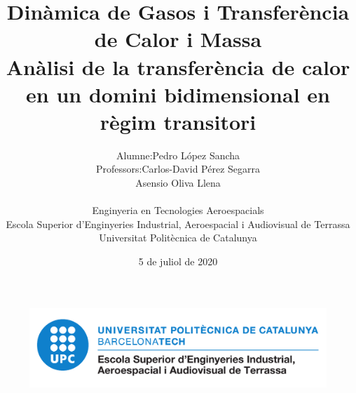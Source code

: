 
\title{
    \LARGE
    \textbf{Dinàmica de Gasos i Transferència de Calor i Massa}\\
    \textbf{\large{Anàlisi de la transferència de calor en un domini bidimensional en règim transitori}}\\
}

\author{
    \begin{tabular}{rl}
    	\vspace{4mm}
        Alumne:    		& Pedro López Sancha 			\\ 
        Professors:  	& Carlos-David Pérez Segarra 	\\
        				& Asensio Oliva Llena
    \end{tabular}
    \vspace{1cm} \\
    Enginyeria en Tecnologies Aeroespacials \\
    \vspace{0.1cm}
    Escola Superior d'Enginyeries Industrial, Aeroespacial i Audiovisual de Terrassa \\
    \vspace{0.1cm}
    Universitat Politècnica de Catalunya\\
    \vspace{0.5cm} 
}

\date{5 de juliol de 2020}

\begin{titlepage}
	\vspace*{\fill}
    \begin{center}
        \thetitle
        \vspace{1cm}
        \large{\theauthor}
        \thedate
    \end{center}
	\begin{figure}[ht]
		\centering
		\includegraphics[width=0.6\linewidth]{imagenes/00_general/logo_eseiaat.pdf}
	\end{figure}
    \vspace*{\fill}
\end{titlepage}


